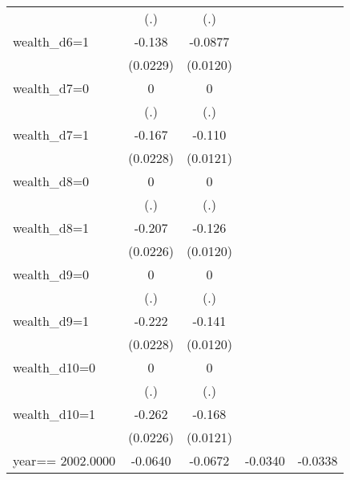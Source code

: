 \begin{table}[htbp]
\begin{tabular}{l*{4}{c}}
                &      (.)         &      (.)         &                  &                  \\
wealth\_d6=1     &   -0.138\sym{***}&  -0.0877\sym{***}&                  &                  \\
                & (0.0229)         & (0.0120)         &                  &                  \\
wealth\_d7=0     &        0         &        0         &                  &                  \\
                &      (.)         &      (.)         &                  &                  \\
wealth\_d7=1     &   -0.167\sym{***}&   -0.110\sym{***}&                  &                  \\
                & (0.0228)         & (0.0121)         &                  &                  \\
wealth\_d8=0     &        0         &        0         &                  &                  \\
                &      (.)         &      (.)         &                  &                  \\
wealth\_d8=1     &   -0.207\sym{***}&   -0.126\sym{***}&                  &                  \\
                & (0.0226)         & (0.0120)         &                  &                  \\
wealth\_d9=0     &        0         &        0         &                  &                  \\
                &      (.)         &      (.)         &                  &                  \\
wealth\_d9=1     &   -0.222\sym{***}&   -0.141\sym{***}&                  &                  \\
                & (0.0228)         & (0.0120)         &                  &                  \\
wealth\_d10=0    &        0         &        0         &                  &                  \\
                &      (.)         &      (.)         &                  &                  \\
wealth\_d10=1    &   -0.262\sym{***}&   -0.168\sym{***}&                  &                  \\
                & (0.0226)         & (0.0121)         &                  &                  \\
year==  2002.0000&  -0.0640\sym{***}&  -0.0672\sym{***}&  -0.0340\sym{***}&  -0.0338\sym{***}\\

\end{tabular}
\end{table}
